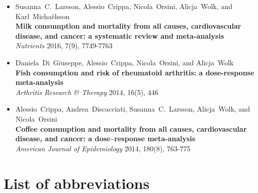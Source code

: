\documentclass[11pt,a4paper,twoside,openany]{book}\usepackage{knitr}
\makeatletter
\def\cleardoublepage{\clearpage\if@twoside
\ifodd\c@page
\else\hbox{}\thispagestyle{empty}\newpage
\if@twocolumn\hbox{}\newpage\fi\fi\fi}
\makeatother
\begin{document}
{\begin{itemize}
\item Susanna~C.~Larsson, Alessio~Crippa, Nicola~Orsini, Alicja~Wolk, and Karl~Micha{\"e}lsson \\ \textbf{Milk consumption and mortality from all causes, cardiovascular disease, and cancer: a systematic review and meta-analysis} \\ \textit{Nutrients} 2016, 7(9), 7749-7763
\item Daniela~Di~Giuseppe, Alessio~Crippa, Nicola~Orsini, and Alicja~Wolk \\ \textbf{Fish consumption and risk of rheumatoid arthritis: a dose-response meta-analysis} \\ \textit{Arthritis Research \& Therapy} 2014, 16(5), 446
\item Alessio~Crippa, Andrea~Discacciati, Susanna~C.~Larsson, Alicja~Wolk, and Nicola~Orsini \\ \textbf{Coffee consumption and mortality from all causes, cardiovascular disease, and cancer: a dose--response meta-analysis} \\ \textit{American Journal of Epidemiology} 2014, 180(8), 763-775
\end{itemize}
\cleardoublepage
{}
\tableofcontents
{} 

%

\chapter*{List of abbreviations}
\begin{tabular}{ll}


\end{tabular}}
\end{document}

